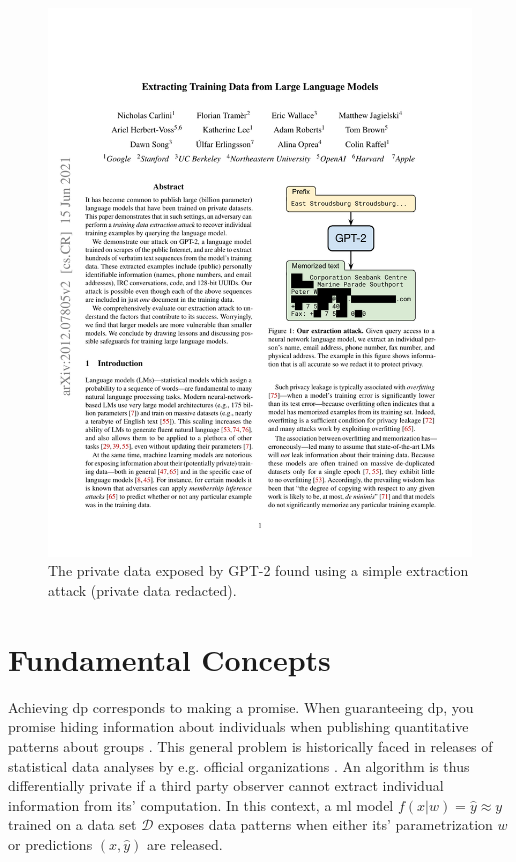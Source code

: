 \documentclass[12pt,fleqn,twocolumn]{article}
\begin{document}
\begin{figure}[H]
    \centering
        \includegraphics[clip, trim=11.5cm 12cm 2.5cm 8cm, width=.8\linewidth]{extracting.pdf}
        \caption{The private data exposed by GPT-2 found using a simple extraction attack \cite[Fig. 1]{carlini2021extracting} (private data redacted).}
    \label{fig:extracting.pdf}
\end{figure}\noindent

\section*{Fundamental Concepts}%
\label{sec:Fundamental Concepts}
Achieving \acrshort{dp} corresponds to making a promise.
When guaranteeing \acrshort{dp}, you promise hiding information about individuals when publishing quantitative patterns about groups \cite[pp. 5]{dwork2014alg}.
This general problem is historically faced in releases of statistical data analyses by e.g. official organizations \cite{dalenius1977stat, wiki2022diff}.
An algorithm is thus differentially private if a third party observer cannot extract individual information from its' computation.
In this context, a \acrfull{ml} model \(f(x|w)=\hat y \approx y\) trained on a data set \(\mathcal D\) exposes data patterns when either its' parametrization $w$ or predictions $(x, \hat y)$ are released.
\end{document}
